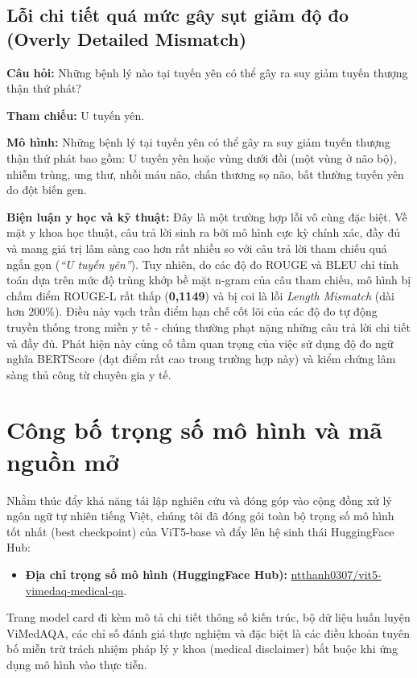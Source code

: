 \subsection{Lỗi chi tiết quá mức gây sụt giảm độ đo (Overly Detailed Mismatch)}
\begin{tcolorbox}[colback=codebg, colframe=myblue, title={Ví dụ thực tế về câu trả lời y học chính xác bị chấm điểm thấp}]
\small\raggedright
\textbf{Câu hỏi:} Những bệnh lý nào tại tuyến yên có thể gây ra suy giảm tuyến thượng thận thứ phát?\par
\textbf{Tham chiếu:} U tuyến yên.\par
\textbf{Mô hình:} Những bệnh lý tại tuyến yên có thể gây ra suy giảm tuyến thượng thận thứ phát bao gồm: U tuyến yên hoặc vùng dưới đồi (một vùng ở não bộ), nhiễm trùng, ung thư, nhồi máu não, chấn thương sọ não, bất thường tuyến yên do đột biến gen.
\end{tcolorbox}
\textbf{Biện luận y học và kỹ thuật:} Đây là một trường hợp lỗi vô cùng đặc biệt. Về mặt y khoa học thuật, câu trả lời sinh ra bởi mô hình cực kỳ chính xác, đầy đủ và mang giá trị lâm sàng cao hơn rất nhiều so với câu trả lời tham chiếu quá ngắn gọn (\textit{``U tuyến yên''}). Tuy nhiên, do các độ đo ROUGE và BLEU chỉ tính toán dựa trên mức độ trùng khớp bề mặt n-gram của câu tham chiếu, mô hình bị chấm điểm ROUGE-L rất thấp (\textbf{0,1149}) và bị coi là lỗi \textit{Length Mismatch} (dài hơn $200\%$). Điều này vạch trần điểm hạn chế cốt lõi của các độ đo tự động truyền thống trong miền y tế - chúng thường phạt nặng những câu trả lời chi tiết và đầy đủ. Phát hiện này củng cố tầm quan trọng của việc sử dụng độ đo ngữ nghĩa BERTScore (đạt điểm rất cao trong trường hợp này) và kiểm chứng lâm sàng thủ công từ chuyên gia y tế.

\section{Công bố trọng số mô hình và mã nguồn mở}
Nhằm thúc đẩy khả năng tái lập nghiên cứu và đóng góp vào cộng đồng xử lý ngôn ngữ tự nhiên tiếng Việt, chúng tôi đã đóng gói toàn bộ trọng số mô hình tốt nhất (best checkpoint) của ViT5-base và đẩy lên hệ sinh thái HuggingFace Hub:
\begin{itemize}
    \item \textbf{Địa chỉ trọng số mô hình (HuggingFace Hub):} \href{https://huggingface.co/ntthanh0307/vit5-vimedaq-medical-qa}{ntthanh0307/vit5-vimedaq-medical-qa}.
\end{itemize}
Trang model card đi kèm mô tả chi tiết thông số kiến trúc, bộ dữ liệu huấn luyện ViMedAQA, các chỉ số đánh giá thực nghiệm và đặc biệt là các điều khoản tuyên bố miễn trừ trách nhiệm pháp lý y khoa (medical disclaimer) bắt buộc khi ứng dụng mô hình vào thực tiễn.

